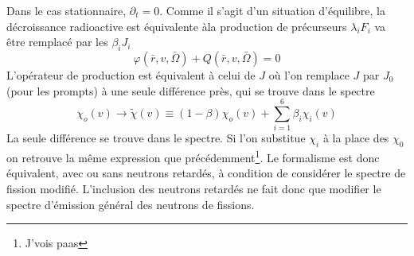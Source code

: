 Dans le cas stationnaire, $\partial_t = 0$. Comme il s'agit d'un situation d'équilibre, la 
décroissance radioactive est équivalente àla production de précurseurs $\lambda_i F_i$ va être 
remplacé par les $\beta_iJ_i$
\begin{equation}
[(1 - \beta ){J_o} - K + \sum\limits_{i = 1}^6    {\beta _i}{J_i}]\varphi (\bar r,v,\bar \Omega ) + Q(\bar r,v,\bar \Omega ) = 0
\end{equation}
L'opérateur de production est équivalent à celui de $J$ où l'on remplace $J$ par $J_0$ (pour les 
prompts) à une seule différence près, qui se trouve dans le spectre
\begin{equation}
{\chi _o}(v) \to \tilde \chi (v) \equiv (1 - \beta ){\chi _o}(v) + \sum\limits_{i = 1}^6    {\beta _i}{\chi _i}(v)
\end{equation}
La seule différence se trouve dans le spectre. Si l'on substitue $\chi_i$ à la place des 
$\chi_0$ on retrouve la même expression que précédemment\footnote{J'vois paas}. Le formalisme est 
donc équivalent, avec ou sans neutrons retardés, à condition de considérer le spectre de fission 
modifié. L'inclusion des neutrons retardés ne fait donc que modifier le spectre d'émission 
général des neutrons de fissions.



